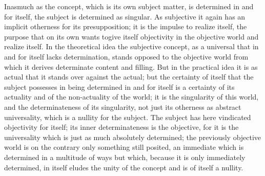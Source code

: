 Inasmuch as the concept,
which is its own subject matter,
is determined in and for itself,
the subject is determined as singular.
As subjective it again has
an implicit otherness for its presupposition;
it is the impulse to realize itself,
the purpose that on its own wants togive itself
objectivity in the objective world
and realize itself.
In the theoretical idea the subjective concept,
as a universal that in and for itself lacks determination,
stands opposed to the objective world
from which it derives determinate content and filling.
But in the practical idea it is as actual
that it stands over against the actual;
but the certainty of itself that the subject possesses
in being determined in and for itself is
a certainty of its actuality
and of the non-actuality of the world;
it is the singularity of this world,
and the determinateness of its singularity,
not just its otherness as abstract universality,
which is a nullity for the subject.
The subject has here vindicated objectivity for itself;
its inner determinateness is the objective,
for it is the universality which is just
as much absolutely determined;
the previously objective world is on the
contrary only something still posited,
an immediate which is determined in
a multitude of ways but which,
because it is only immediately determined,
in itself eludes the unity of the concept
and is of itself a nullity.

